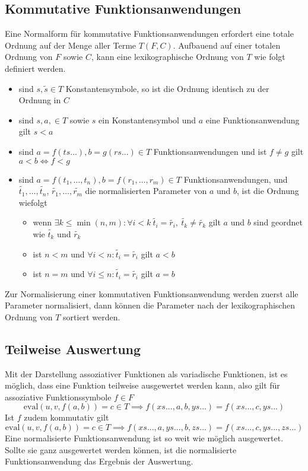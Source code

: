 \documentclass{article}
\begin{document}
\subsection{Kommutative Funktionsanwendungen}
Eine Normalform für kommutative Funktionsanwendungen erfordert eine totale Ordnung auf der Menge aller Terme $T(F, C)$. Aufbauend auf einer totalen Ordnung von $F$ sowie $C$, kann eine lexikographische Ordnung von $T$ wie folgt definiert werden. 
\begin{itemize}
	\item{sind $s, \tilde{s} \in T$ Konstantensymbole, so ist die Ordnung identisch zu der Ordnung in $C$}
	\item{sind $s, a, \in T$ sowie $s$ ein Konstantensymbol und $a$ eine Funktionsanwendung gilt $s < a$ }
	\item{sind $a = f(ts...), b = g(rs...) \in T$ Funktionsanwendungen und ist $f \neq g$ gilt $a < b \iff f < g $}
	\item{sind $a = f(t_1, \dots, t_n), b = f(r_1, \dots, r_m) \in T$ Funktionsanwendungen, und $\tilde{t_1}, \dots, \tilde{t_n}$, $\tilde{r_1}, \dots, \tilde{r_m}$ die normalisierten Parameter von $a$ und $b$, ist die Ordnung wiefolgt}
	\begin{itemize}
		\item{wenn $\exists k \leq \min{(n, m)} \colon \forall i < k ~ \tilde{t_i} = \tilde{r_i} ,~ \tilde{t_k} \neq \tilde{r_k} $ gilt $a$ und $b$ sind geordnet wie $\tilde{t_k}$ und $\tilde{r_k}$}
		\item{ist $n < m$ und $\forall i < n\colon \tilde{t_i} = \tilde{r_i}$ gilt $a < b$}
		\item{ist $n = m$ und $\forall i \leq n\colon \tilde{t_i} = \tilde{r_i}$ gilt $a = b$}
	\end{itemize}
\end{itemize}
Zur Normalisierung einer kommutativen Funktionsanwendung werden zuerst alle Parameter normalisiert, dann können die Parameter nach der lexikographischen Ordnung von $T$ sortiert werden.

\subsection{Teilweise Auswertung}
Mit der Darstellung assoziativer Funktionen als variadische Funktionen, ist es möglich, dass eine Funktion teilweise ausgewertet werden kann, also gilt für assoziative Funktionssymbole $f \in F$
$$\mathrm{eval}(u, v, f(a, b)) = c \in T \implies f(xs..., a, b, ys...) = f(xs..., c, ys...)$$
Ist $f$ zudem kommutativ gilt 
$$\mathrm{eval}(u, v, f(a, b)) = c \in T \implies f(xs..., a, ys..., b, zs...) = f(xs..., c, ys..., zs...)$$
Eine normalisierte Funktionsanwendung ist so weit wie möglich ausgewertet. Sollte sie ganz ausgewertet werden können, ist die normalisierte Funktionsanwendung das Ergebnis der Auswertung.
\end{document}
